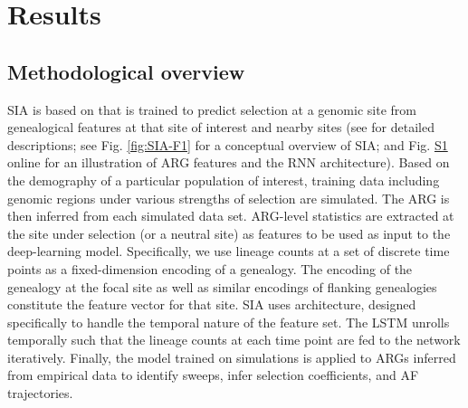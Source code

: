 \section{Results}
\subsection{Methodological overview}
\ac{SIA} is based on  that is trained to predict selection at a genomic site from genealogical features at that site of interest and nearby sites (see  for detailed descriptions; see Fig. \ref{fig:SIA-F1} for a conceptual overview of \ac{SIA}; and Fig. \href{https://academic.oup.com/mbe/article/39/1/msab332/6433161#supplementary-data}{S1} online for an illustration of \ac{ARG} features and the \ac{RNN} architecture). Based on the demography of a particular population of interest, training data including genomic regions under various strengths of selection are simulated. The \ac{ARG} is then inferred from each simulated data set. \ac{ARG}-level statistics are extracted at the site under selection (or a neutral site) as features to be used as input to the deep-learning model. Specifically, we use lineage counts at a set of discrete time points as a fixed-dimension encoding of a genealogy. The encoding of the genealogy at the focal site as well as similar encodings of flanking genealogies constitute the feature vector for that site. \ac{SIA} uses  architecture, designed specifically to handle the temporal nature of the feature set. The \ac{LSTM} unrolls temporally such that the lineage counts at each time point are fed to the network iteratively. Finally, the model trained on simulations is applied to \acp{ARG} inferred from empirical data to identify sweeps, infer selection coefficients, and \ac{AF} trajectories.

